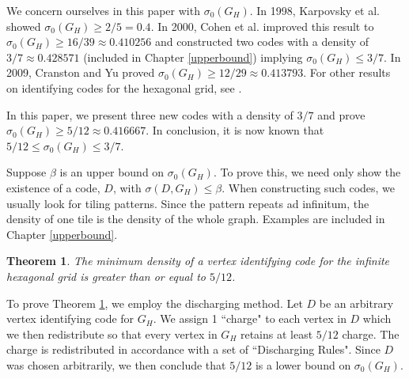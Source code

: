 \documentclass[12pt]{report}
\numberwithin{equation}{chapter}
\newtheorem{theorem}{Theorem}[chapter]
\theoremstyle{definition}
\theoremstyle{remark}
\begin{document}
We concern ourselves in this paper with $\sigma_0(G_H)$.  In 1998, Karpovsky et al. \cite{karpovsky} showed $\sigma_0(G_H) \geq 2/5 = 0.4$.  In 2000, Cohen et al. \cite{cohen2000} improved this result to $\sigma_0(G_H) \geq 16/39 \approx 0.410256$ and constructed two codes with a density of $3/7 \approx 0.428571$ (included in Chapter \ref{upperbound}) implying $\sigma_0(G_H) \leq 3/7$.  In 2009, Cranston and Yu \cite{12/29} proved $\sigma_0(G_H) \geq 12/29 \approx 0.413793$.   For other results on identifying codes for the hexagonal grid, see \cite{martin, stanton}. 


In this paper, we present three new codes with a density of $ 3/7$ and prove $\sigma_0(G_H) \geq 5/12 \approx 0.416667$.  In conclusion, it is now known that $5/12 \leq \sigma_0(G_H) \leq 3/7$.




Suppose $\beta$ is an upper bound on $\sigma_0(G_H)$.  To prove this, we need only show the existence of a code, $D$, with $\sigma(D,G_H) \leq \beta$.  When constructing such codes, we usually look for tiling patterns.  Since the pattern repeats ad infinitum, the density of one tile is the density of the whole graph.  Examples are included in Chapter \ref{upperbound}.%

\bigskip

\begin{theorem}
\label{theorem}
The minimum density of a vertex identifying code for the infinite hexagonal grid is greater than or equal to $5/12$.
\end{theorem}

\bigskip

To prove Theorem \ref{theorem}, we employ the discharging method.  Let $D$ be an arbitrary vertex identifying code for $G_H$.  We assign 1 ``charge" to each vertex in $D$ which we then redistribute so that every vertex in $G_H$ retains at least $5/12$ charge.  The charge is redistributed in accordance with a set of ``Discharging Rules".  Since $D$ was chosen arbitrarily, we then conclude that $5/12$ is a lower bound on $\sigma_0(G_H)$.
\end{document}
